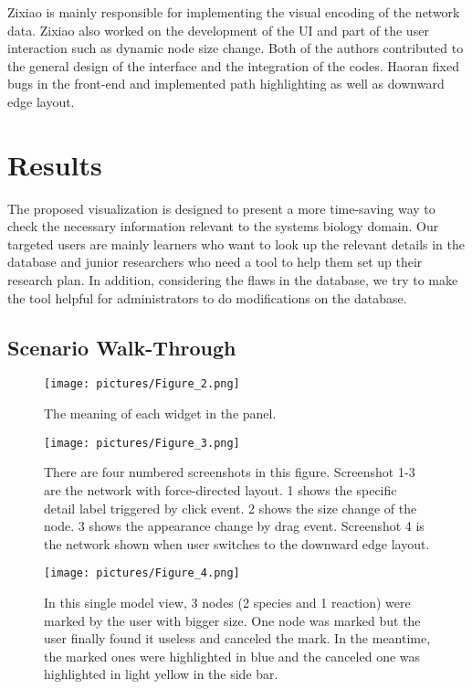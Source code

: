 \documentclass[journal]{vgtc}                %
\begin{document}
Zixiao is mainly responsible for implementing the visual encoding of the network data. Zixiao also worked on the development of the UI and part of the user interaction such as dynamic node size change. Both of the authors contributed to the general design of the interface and the integration of the codes. Haoran fixed bugs in the front-end and implemented path highlighting as well as downward edge layout.




\section{Results}
The proposed visualization is designed to present a more time-saving way to check the necessary information relevant to the systems biology domain. Our targeted users are mainly learners who want to look up the relevant details in the database and junior researchers who need a tool to help them set up their research plan. In addition, considering the flaws in the database, we try to make the tool helpful for administrators to do modifications on the database.

\subsection{Scenario Walk-Through}

\begin{figure}
\texttt{[image: pictures/Figure\_2.png]}
\caption{The meaning of each widget in the panel. }
\label{fig:scene2}
\end{figure}

\begin{figure}
\texttt{[image: pictures/Figure\_3.png]}
\caption{There are four numbered screenshots in this figure. Screenshot 1-3 are the network with force-directed layout. 1 shows the specific detail label triggered by click event. 2 shows the size change of the node. 3 shows the appearance change by drag event. Screenshot 4 is the network shown when user switches to the downward edge layout. }
\label{fig:scene3}
\end{figure}

\begin{figure}
\texttt{[image: pictures/Figure\_4.png]}
\caption{In this single model view, 3 nodes (2 species and 1 reaction) were marked by the user with bigger size. One node was marked but the user finally found it useless and canceled the mark. In the meantime, the marked ones were highlighted in blue and the canceled one was highlighted in light yellow in the side bar. }
\label{fig:scene4}
\end{figure}
\end{document}
